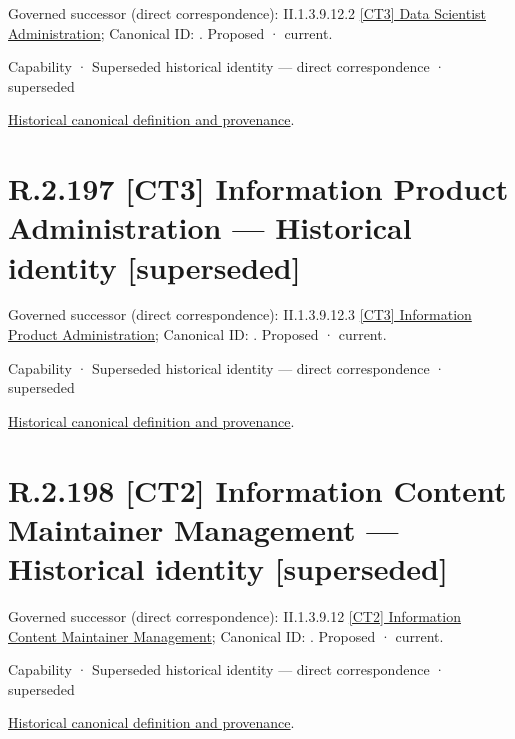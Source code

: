 {\small Governed successor (direct correspondence): II.1.3.9.12.2 \hyperref[element:3bb1a11fba234717bf40c9e6452f401a]{[CT3] Data Scientist Administration}; Canonical ID: \texttt{}. Proposed · current.}\par
\label{element:1cb497aec93c4b82ba7f5b622813e54e}
{\small Capability · Superseded historical identity — direct correspondence · superseded}\par
\href{../../../../../../../continuum/strategy/capability/1cb497aec93c4b82ba7f5b622813e54e.md}{Historical canonical definition and provenance}.\par
\section*{R.2.197 [CT3] Information Product Administration — Historical identity [superseded]}
\label{navigation:R.2.197}

{\small Governed successor (direct correspondence): II.1.3.9.12.3 \hyperref[element:b5a6a31855834ea58870ebb6c51ed4b0]{[CT3] Information Product Administration}; Canonical ID: \texttt{}. Proposed · current.}\par
\label{element:5d9b7f8d2d7b41759b6d4931c1d2aaa2}
{\small Capability · Superseded historical identity — direct correspondence · superseded}\par
\href{../../../../../../../continuum/strategy/capability/5d9b7f8d2d7b41759b6d4931c1d2aaa2.md}{Historical canonical definition and provenance}.\par
\section*{R.2.198 [CT2] Information Content Maintainer Management — Historical identity [superseded]}
\label{navigation:R.2.198}

{\small Governed successor (direct correspondence): II.1.3.9.12 \hyperref[element:b81a1ab42af24c2e9896b8f3f78d291a]{[CT2] Information Content Maintainer Management}; Canonical ID: \texttt{}. Proposed · current.}\par
\label{element:acb977e879204f1491293e5452e0ddf0}
{\small Capability · Superseded historical identity — direct correspondence · superseded}\par
\href{../../../../../../../continuum/strategy/capability/acb977e879204f1491293e5452e0ddf0.md}{Historical canonical definition and provenance}.\par
